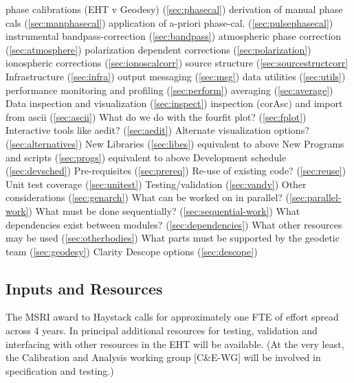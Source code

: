 \begin{outline}[enumerate]
    \3 phase calibrations (EHT v Geodesy) (\ref{sec:phasecal})
    \3 derivation of manual phase cals (\ref{sec:manphasecal})
    \3 application of a-priori phase-cal. (\ref{sec:pulsephasecal})
    \3 instrumental bandpass-correction (\ref{sec:bandpass})
    \3 atmospheric phase correction (\ref{sec:atmosphere})
    \3 polarization dependent corrections (\ref{sec:polarization})
    \3 ionospheric corrections (\ref{sec:ionoscalcorr})
    \3 source structure (\ref{sec:sourcestructcorr}
  \2 Infrastructure (\ref{sec:infra})
    \3 output messaging (\ref{sec:msg})
    \3 data utilities (\ref{sec:utils})
    \3 performance monitoring and profiling (\ref{sec:perform})
    \3 averaging (\ref{sec:average})
  \2 Data inspection and visualization (\ref{sec:inspect})
    \3 inspection (corAsc) and import from ascii (\ref{sec:ascii})
    \3 What do we do with the fourfit plot? (\ref{sec:fplot})
    \3 Interactive tools like aedit? (\ref{sec:aedit})
    \3 Alternate visualization options? (\ref{sec:alternatives})
  \2 New Libraries (\ref{sec:libes})
    \3 equivalent to above
  \2 New Programs and scripts (\ref{sec:progs})
    \3 equivalent to above
\1 Development schedule (\ref{sec:devsched})
  \2 Pre-requisites (\ref{sec:prereq})
  \2 Re-use of existing code? (\ref{sec:reuse})
  \2 Unit test coverage (\ref{sec:unitest})
  \2 Testing/validation (\ref{sec:vandv})
  \2 Other considerations (\ref{sec:genarch})
    \3 What can be worked on in parallel? (\ref{sec:parallel-work})
    \3 What must be done sequentially? (\ref{sec:sequential-work})
    \3 What dependencies exist between modules? (\ref{sec:dependencies})
    \3 What other resources may be used (\ref{sec:otherbodies})
    \3 What parts must be supported by the geodetic team (\ref{sec:geodesy})
    \3 Clarity Descope options (\ref{sec:descope})
\end{outline}

\subsection{Inputs and Resources}
\label{sec:money}

The MSRI award to Haystack calls for approximately one FTE of effort
spread across 4 years.  In principal additional resources for testing,
validation and interfacing with other resources in the EHT will be
available.  (At the very least, the Calibration and Analysis working
group [C\&E-WG] will be involved in specification and testing.)

